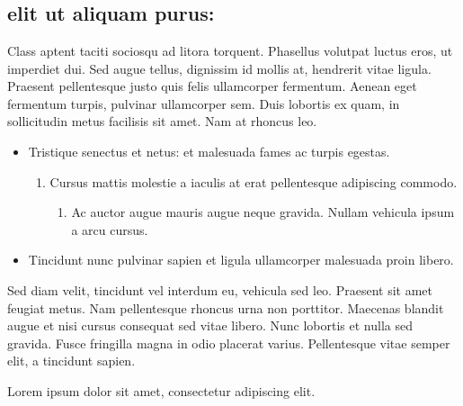 \documentclass{book}
\begin{document}
\chapter{}
\section {elit ut aliquam purus:}
Class aptent taciti sociosqu ad litora torquent.
Phasellus volutpat luctus eros, ut imperdiet dui.
Sed augue tellus, dignissim id mollis at, hendrerit vitae ligula.
Praesent pellentesque justo quis felis ullamcorper fermentum.
Aenean eget fermentum turpis, pulvinar ullamcorper sem.
Duis lobortis ex quam, in sollicitudin metus facilisis sit amet. Nam at rhoncus leo.

\begin{itemize}
    \item Tristique senectus et netus: et malesuada fames ac turpis egestas.
          \begin{enumerate}
              \item Cursus mattis molestie a iaculis at erat pellentesque adipiscing commodo.
                    \begin{enumerate}
                        \item Ac auctor augue mauris augue neque gravida. Nullam vehicula ipsum a arcu cursus.
                    \end{enumerate}
          \end{enumerate}
    \item Tincidunt nunc pulvinar sapien et ligula ullamcorper malesuada proin libero.
\end{itemize}

Sed diam velit, tincidunt vel interdum eu, vehicula sed leo.
Praesent sit amet feugiat metus. Nam pellentesque rhoncus urna non porttitor.
Maecenas blandit augue et nisi cursus consequat sed vitae libero.
Nunc lobortis et nulla sed gravida. Fusce fringilla magna in odio placerat varius.
Pellentesque vitae semper elit, a tincidunt sapien.

\hspace{3cm} Lorem ipsum dolor sit amet, consectetur adipiscing elit.
\end{document}
